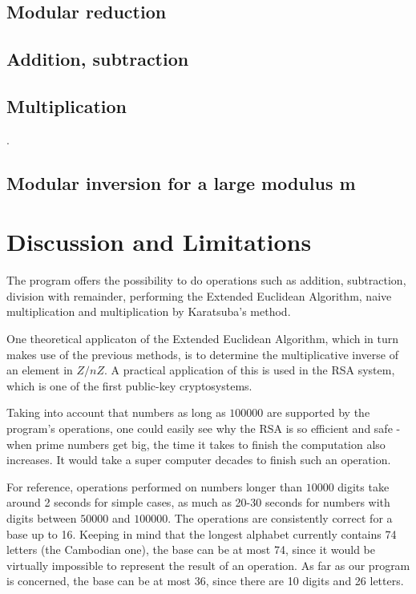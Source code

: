 \documentclass[a4paper]{article}
\begin{document}
\subsection{Modular reduction}

\subsection{Addition, subtraction}

\subsection{Multiplication}

\cite{shoup}.

\subsection{Modular inversion for a large modulus m}

\section{Discussion and Limitations}


The program offers the possibility to do operations such as addition, subtraction, division with remainder, performing the Extended Euclidean Algorithm, naive multiplication and multiplication by Karatsuba's method. 

One theoretical applicaton of the Extended Euclidean Algorithm, which in turn makes use of the previous methods, is to determine the multiplicative inverse of an element in $Z/nZ.$ A practical application of this is used in the RSA system, which is one of the first public-key cryptosystems. 

Taking into account that numbers as long as $100 000$ are supported by the program's operations, one could easily see why the RSA is so efficient and safe - when prime numbers get big, the time it takes to finish the computation also increases. It would take a super computer decades to finish such an operation. 

For reference, operations performed on numbers longer than $10 000$ digits take around 2 seconds for simple cases, as much as 20-30 seconds for numbers with digits between $50 000$ and $100 000$. The operations are consistently correct for a base up to 16. Keeping in mind that the longest alphabet currently contains 74 letters (the Cambodian one), the base can be at most 74, since it would be virtually impossible to represent the result of an operation. As far as our program is concerned, the base can be at most 36, since there are 10 digits and 26 letters. 
\end{document}
